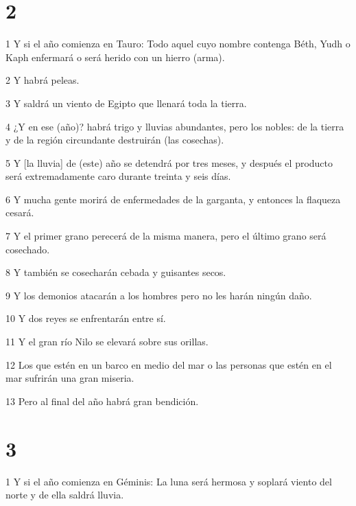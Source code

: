 \chapter{2}

\par 1 Y si el año comienza en Tauro: Todo aquel cuyo nombre contenga Béth, Yudh o Kaph enfermará o será herido con un hierro (arma).

\par 2 Y habrá peleas.

\par 3 Y saldrá un viento de Egipto que llenará toda la tierra.

\par 4 ¿Y en ese (año)? habrá trigo y lluvias abundantes, pero los nobles: de la tierra y de la región circundante destruirán (las cosechas).

\par 5 Y [la lluvia] de (este) año se detendrá por tres meses, y después el producto será extremadamente caro durante treinta y seis días.

\par 6 Y mucha gente morirá de enfermedades de la garganta, y entonces la flaqueza cesará.

\par 7 Y el primer grano perecerá de la misma manera, pero el último grano será cosechado.

\par 8 Y también se cosecharán cebada y guisantes secos.

\par 9 Y los demonios atacarán a los hombres pero no les harán ningún daño.

\par 10 Y dos reyes se enfrentarán entre sí.

\par 11 Y el gran río Nilo se elevará sobre sus orillas.

\par 12 Los que estén en un barco en medio del mar o las personas que estén en el mar sufrirán una gran miseria.

\par 13 Pero al final del año habrá gran bendición.

\chapter{3}

\par 1 Y si el año comienza en Géminis: La luna será hermosa y soplará viento del norte y de ella saldrá lluvia.

